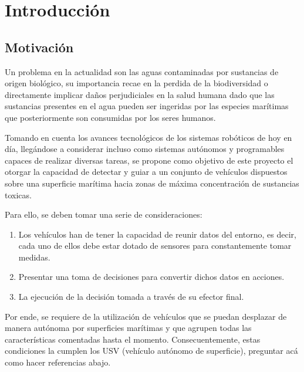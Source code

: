 

\chapter{Introducción} 
\label{ch:chapter1}
\setlength{\parindent}{0cm}
\setlength{\parskip}{4mm}

\section{Motivación}\label{Motiv}

Un problema en la actualidad son las aguas contaminadas por sustancias de origen biológico, su importancia recae en la perdida de la biodiversidad o directamente implicar daños perjudiciales en la salud humana dado que las sustancias presentes en el agua pueden ser ingeridas por las especies marítimas que posteriormente son consumidas por los seres humanos.

Tomando en cuenta los avances tecnológicos de los sistemas robóticos de hoy en día, llegándose a considerar incluso como sistemas autónomos y programables capaces de realizar diversas tareas, se propone como objetivo de este proyecto el otorgar la capacidad de detectar y guiar a un conjunto de vehículos dispuestos sobre una superficie marítima hacia zonas de máxima concentración de sustancias toxicas.

Para ello, se deben tomar una serie de consideraciones:

\begin{enumerate}
	\item Los vehículos han de tener la capacidad de reunir datos del entorno, es decir, cada uno de ellos debe estar dotado de sensores para constantemente tomar medidas.
	\item Presentar una toma de decisiones para convertir dichos datos en acciones.
	\item La ejecución de la decisión tomada a través de su efector final.
\end{enumerate}

Por ende, se requiere de la utilización de vehículos que se puedan desplazar de manera autónoma por superficies marítimas y que agrupen todas las características comentadas hasta el momento. Consecuentemente, estas condiciones la cumplen los USV (vehículo autónomo de superficie), preguntar acá como hacer referencias abajo.

